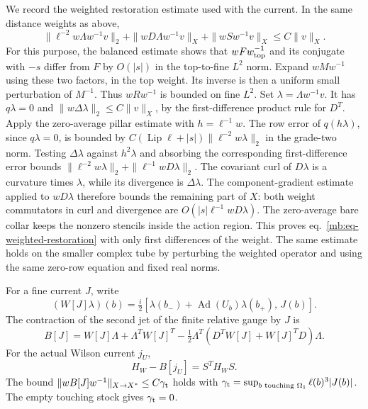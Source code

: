 \documentclass[11pt,letterpaper,reqno]{amsart}
\makeatletter
\numberwithin{equation}{section}
\renewcommand{\eqref}[1]{\textup{eq.~\ref{#1}}}
\theoremstyle{definition}
\newcommand{\ms@minorstart}{%
  \pushQED{\qed}\renewcommand{\qedsymbol}{$\blacksquare$}}
\newenvironment{proposition}[1][]{\ms@minorstart\ms@proposition[#1]}
  {\popQED\endms@proposition}
\theoremstyle{remark}
\makeatother
\begin{document}
We record the weighted restoration estimate used with the current. In the same distance weights as above,
\begin{equation}\label{mb:eq-weighted-restoration}
 \|\ell^{-2}w\Lambda w^{-1}v\|_2+
 \|wD\Lambda w^{-1}v\|_X+\|wSw^{-1}v\|_X\le C\|v\|_X.
\end{equation}
For this purpose, the balanced estimate shows that \(w Fw_{\rm top}^{-1}\) and its conjugate with \(-s\) differ from \(F\) by \(O(|s|)\) in the top-to-fine \(L^2\) norm. Expand \(wM w^{-1}\) using these two factors, in the top weight. Its inverse is then a uniform small perturbation of \(M^{-1}\). Thus \(wRw^{-1}\) is bounded on fine \(L^2\). Set \(\lambda=\Lambda w^{-1}v\). It has \(q\lambda=0\) and \(\|w\Delta\lambda\|_2\le C\|v\|_X\), by the first-difference product rule for \(D^T\). Apply the zero-average pillar estimate with \(h=\ell^{-1}w\). The row error of \(q(h\lambda)\), since \(q\lambda=0\), is bounded by \(C(\operatorname{Lip}\ell+|s|)\|\ell^{-2}w\lambda\|_2\) in the grade-two norm. Testing \(\Delta\lambda\) against \(h^2\lambda\) and absorbing the corresponding first-difference error bounds \(\|\ell^{-2}w\lambda\|_2+\|\ell^{-1}wD\lambda\|_2\). The covariant curl of \(D\lambda\) is a curvature times \(\lambda\), while its divergence is \(\Delta\lambda\). The component-gradient estimate applied to \(wD\lambda\) therefore bounds the remaining part of \(X\): both weight commutators in curl and divergence are \(O(|s|\ell^{-1}wD\lambda)\). The zero-average bare collar keeps the nonzero stencils inside the action region. This proves \eqref{mb:eq-weighted-restoration} with only first differences of the weight. The same estimate holds on the smaller complex tube by perturbing the weighted operator and using the same zero-row equation and fixed real norms.

\begin{proposition}[Current completion]
\label{mb:prop-current-completion}
For a fine current \(J\), write
\[
 (W[J]\lambda)(b)=\tfrac i2[\lambda(b_-)+
                   \operatorname{Ad}(U_b)\lambda(b_+),\,J(b)] .
\]
The contraction of the second jet of the finite relative gauge by \(J\) is
\begin{equation}\label{mb:eq-current-completion}
 B[J]=W[J]\Lambda+\Lambda^T W[J]^T-
          \tfrac12\Lambda^T(D^T W[J]+W[J]^TD)\Lambda .
\end{equation}
For the actual Wilson current \(j_U\),
\[
                 H_W-B[j_U]=S^TH_WS .
\]
The bound \(\|wB[J]w^{-1}\|_{X\to X^*}\le C\gamma_{\rm t}\) holds with \(\gamma_{\rm t}=\sup_{b\text{ touching }\Omega_1}\ell(b)^3|J(b)|\). The empty touching stock gives \(\gamma_{\rm t}=0\).
\end{proposition}
\end{document}
